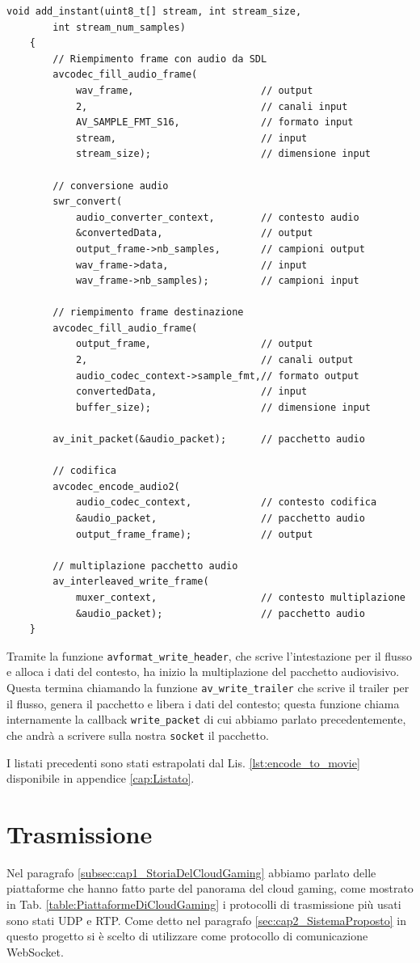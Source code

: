 \begin{lstlisting}[caption=Codice per la codifica audio, label={lst:audioCodecFFmpeg}]
	void add_instant(uint8_t[] stream, int stream_size, 
		int stream_num_samples)
	{
		// Riempimento frame con audio da SDL
		avcodec_fill_audio_frame(
			wav_frame,						// output
			2,								// canali input
			AV_SAMPLE_FMT_S16,				// formato input
			stream,							// input
			stream_size);					// dimensione input			

		// conversione audio
		swr_convert(
			audio_converter_context,		// contesto audio
			&convertedData,					// output
			output_frame->nb_samples,		// campioni output
			wav_frame->data,				// input
			wav_frame->nb_samples);			// campioni input

		// riempimento frame destinazione
		avcodec_fill_audio_frame(
			output_frame, 					// output
			2,								// canali output
			audio_codec_context->sample_fmt,// formato output
			convertedData,					// input
			buffer_size);					// dimensione input			
				
		av_init_packet(&audio_packet);		// pacchetto audio
		
		// codifica
		avcodec_encode_audio2(
			audio_codec_context,			// contesto codifica
			&audio_packet,					// pacchetto audio
			output_frame_frame);			// output			
		
		// multiplazione pacchetto audio
		av_interleaved_write_frame(
			muxer_context,					// contesto multiplazione
			&audio_packet);					// pacchetto audio
	}
\end{lstlisting}

Tramite la funzione \verb|avformat_write_header|, che scrive l'intestazione per il flusso e alloca i dati del contesto, ha inizio la multiplazione del pacchetto audiovisivo. Questa termina chiamando la funzione \verb|av_write_trailer| che scrive il trailer per il flusso, genera il pacchetto e libera i dati del contesto; questa funzione chiama internamente la callback \verb|write_packet| di cui abbiamo parlato precedentemente, che andrà a scrivere sulla nostra \verb|socket| il pacchetto.

I listati precedenti sono stati estrapolati dal Lis. \ref{lst:encode_to_movie} disponibile in appendice \ref{cap:Listato}.



\section{Trasmissione}
Nel paragrafo \ref{subsec:cap1_StoriaDelCloudGaming} abbiamo parlato delle piattaforme che hanno fatto parte del panorama del cloud gaming, come mostrato in Tab. \ref{table:PiattaformeDiCloudGaming} i protocolli di trasmissione più usati sono stati UDP e RTP. Come detto nel paragrafo \ref{sec:cap2_SistemaProposto} in questo progetto si è scelto di utilizzare come protocollo di comunicazione WebSocket.

